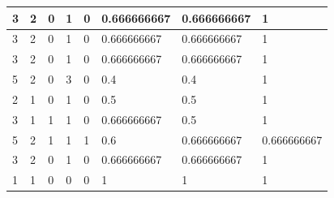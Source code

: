 \begin{small}
\begin{longtable}{|l|l|l|l|l|l|l|l|}
3  & 2                                & 0                                & 1                                & 0                                & 0.666666667                            & 0.666666667                             & 1                                    \\ \hline
3  & 2                                & 0                                & 1                                & 0                                & 0.666666667                            & 0.666666667                             & 1                                    \\ \hline
3  & 2                                & 0                                & 1                                & 0                                & 0.666666667                            & 0.666666667                             & 1                                    \\ \hline
5  & 2                                & 0                                & 3                                & 0                                & 0.4                                    & 0.4                                     & 1                                    \\ \hline
2  & 1                                & 0                                & 1                                & 0                                & 0.5                                    & 0.5                                     & 1                                    \\ \hline
3  & 1                                & 1                                & 1                                & 0                                & 0.666666667                            & 0.5                                     & 1                                    \\ \hline
5  & 2                                & 1                                & 1                                & 1                                & 0.6                                    & 0.666666667                             & 0.666666667                          \\ \hline
3  & 2                                & 0                                & 1                                & 0                                & 0.666666667                            & 0.666666667                             & 1                                    \\ \hline
1  & 1                                & 0                                & 0                                & 0                                & 1                                      & 1                                       & 1                                    \\ \hline

\end{longtable}
\end{small}
